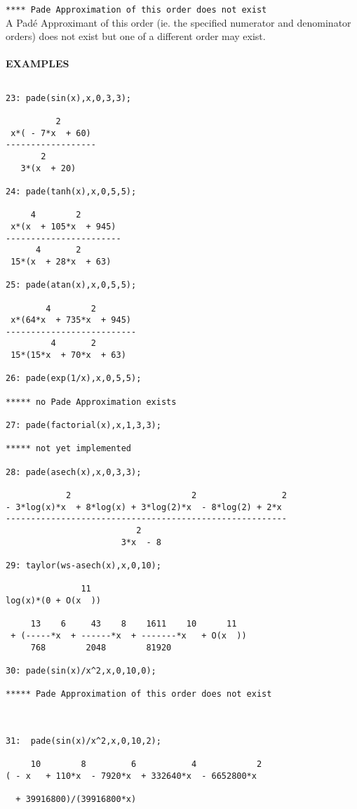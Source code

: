 {\tt ***** Pade Approximation of this order does not exist}\\

A Pad\'{e} Approximant of this order (ie. the specified
numerator and denominator orders) does not exist but one
of a different order may exist.\\ \\


\large{{\bf EXAMPLES}}

\begin{verbatim}

23: pade(sin(x),x,0,3,3);

          2
 x*( - 7*x  + 60)
------------------
       2
   3*(x  + 20)

24: pade(tanh(x),x,0,5,5);

     4        2
 x*(x  + 105*x  + 945)
-----------------------
      4       2
 15*(x  + 28*x  + 63)

25: pade(atan(x),x,0,5,5);

        4        2
 x*(64*x  + 735*x  + 945)
--------------------------
         4       2
 15*(15*x  + 70*x  + 63)

26: pade(exp(1/x),x,0,5,5);

***** no Pade Approximation exists

27: pade(factorial(x),x,1,3,3);

***** not yet implemented

28: pade(asech(x),x,0,3,3);

            2                        2                 2
- 3*log(x)*x  + 8*log(x) + 3*log(2)*x  - 8*log(2) + 2*x
--------------------------------------------------------
                          2
                       3*x  - 8

29: taylor(ws-asech(x),x,0,10);

               11  
log(x)*(0 + O(x  ))

     13    6     43    8    1611    10      11
 + (-----*x  + ------*x  + -------*x   + O(x  ))
     768        2048        81920

30: pade(sin(x)/x^2,x,0,10,0);

***** Pade Approximation of this order does not exist



31:  pade(sin(x)/x^2,x,0,10,2);

     10        8         6           4            2
( - x   + 110*x  - 7920*x  + 332640*x  - 6652800*x

  + 39916800)/(39916800*x)


\end{verbatim}
